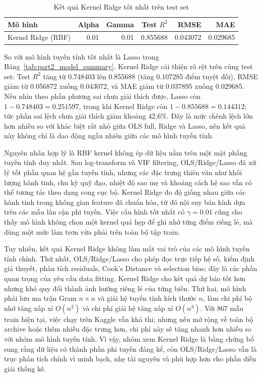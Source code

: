 \begin{table}[H]
\centering
\caption{Kết quả Kernel Ridge tốt nhất trên test set}
\label{tab:part2_kernel_result}
\begin{tabular}{@{}lrrrrr@{}}
\hline
\textbf{Mô hình} & \textbf{Alpha} & \textbf{Gamma} & \textbf{Test $R^2$} & \textbf{RMSE} & \textbf{MAE} \\
\hline
Kernel Ridge (RBF) & 0.01 & 0.01 & 0.855688 & 0.043072 & 0.029685 \\
\hline
\end{tabular}
\end{table}

So với mô hình tuyến tính tốt nhất là Lasso trong Bảng~\ref{tab:part2_model_summary},
Kernel Ridge cải thiện rõ rệt trên cùng test set: Test $R^2$ tăng từ 0.748403 lên 0.855688
(tăng 0.107285 điểm tuyệt đối), RMSE giảm từ 0.056872 xuống 0.043072, và MAE giảm từ
0.037895 xuống 0.029685. Nếu nhìn theo phần phương sai chưa giải thích được, Lasso còn
$1-0.748403=0.251597$, trong khi Kernel Ridge còn $1-0.855688=0.144312$; tức phần sai lệch
chưa giải thích giảm khoảng 42.6\%. Đây là mức chênh lệch lớn hơn nhiều so với khác biệt rất
nhỏ giữa OLS full, Ridge và Lasso, nên kết quả này không chỉ là dao động ngẫu nhiên giữa các
mô hình tuyến tính.

Nguyên nhân hợp lý là RBF kernel không ép dữ liệu nằm trên một mặt phẳng tuyến tính duy nhất.
Sau log-transform và VIF filtering, OLS/Ridge/Lasso đã xử lý tốt phần quan hệ gần tuyến tính,
nhưng các đặc trưng thiên văn như khối lượng hành tinh, chu kỳ quỹ đạo, nhiệt độ sao mẹ và khoảng
cách hệ sao vẫn có thể tương tác theo dạng cong cục bộ. Kernel Ridge đo độ giống nhau giữa các
hành tinh trong không gian feature đã chuẩn hóa, từ đó nội suy bán kính dựa trên các mẫu lân cận
phi tuyến. Việc cấu hình tốt nhất có $\gamma=0.01$ cũng cho thấy mô hình không chọn một kernel quá
hẹp để ghi nhớ từng điểm riêng lẻ, mà dùng một mức làm trơn vừa phải trên toàn bộ tập train.

Tuy nhiên, kết quả Kernel Ridge không làm mất vai trò của các mô hình tuyến tính chính. Thứ nhất,
OLS/Ridge/Lasso cho phép đọc trực tiếp hệ số, kiểm định giả thuyết, phân tích residuals, Cook's
Distance và selection bias; đây là các phần quan trọng của yêu cầu data fitting. Kernel Ridge cho
kết quả dự báo tốt hơn nhưng khó quy đổi thành ảnh hưởng riêng lẻ của từng biến. Thứ hai, mô hình
phải lưu ma trận Gram $n\times n$ và giải hệ tuyến tính kích thước $n$, làm chi phí bộ nhớ tăng
xấp xỉ $O(n^2)$ và chi phí giải hệ tăng xấp xỉ $O(n^3)$. Với 867 mẫu train hiện tại, việc chạy trên
Kaggle vẫn khả thi; nhưng nếu mở rộng về toàn bộ archive hoặc thêm nhiều đặc trưng hơn, chi phí này
sẽ tăng nhanh hơn nhiều so với nhóm mô hình tuyến tính. Vì vậy, nhóm xem Kernel Ridge là bằng chứng
bổ sung rằng dữ liệu có thành phần phi tuyến đáng kể, còn OLS/Ridge/Lasso vẫn là trục phân tích
chính vì minh bạch, nhẹ tài nguyên và phù hợp hơn cho phần diễn giải thống kê.

\FloatBarrier


